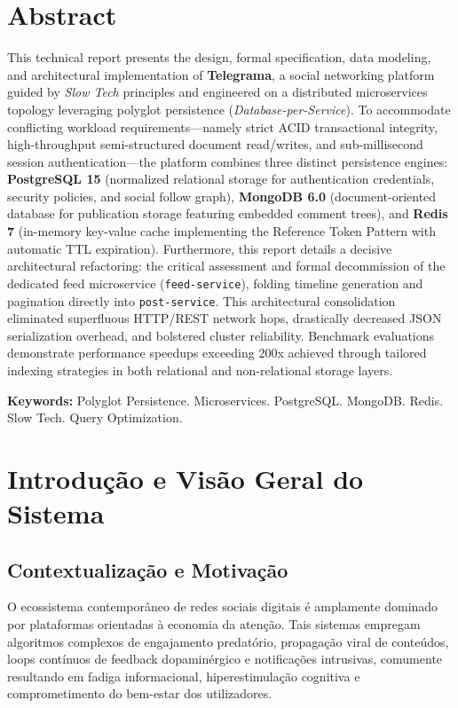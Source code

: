 \documentclass[12pt,a4paper]{report}
\begin{document}
\chapter*{Abstract}
This technical report presents the design, formal specification, data modeling, and architectural implementation of \textbf{Telegrama}, a social networking platform guided by \textit{Slow Tech} principles and engineered on a distributed microservices topology leveraging polyglot persistence (\textit{Database-per-Service}). To accommodate conflicting workload requirements---namely strict ACID transactional integrity, high-throughput semi-structured document read/writes, and sub-millisecond session authentication---the platform combines three distinct persistence engines: \textbf{PostgreSQL 15} (normalized relational storage for authentication credentials, security policies, and social follow graph), \textbf{MongoDB 6.0} (document-oriented database for publication storage featuring embedded comment trees), and \textbf{Redis 7} (in-memory key-value cache implementing the Reference Token Pattern with automatic TTL expiration). Furthermore, this report details a decisive architectural refactoring: the critical assessment and formal decommission of the dedicated feed microservice (\texttt{feed-service}), folding timeline generation and pagination directly into \texttt{post-service}. This architectural consolidation eliminated superfluous HTTP/REST network hops, drastically decreased JSON serialization overhead, and bolstered cluster reliability. Benchmark evaluations demonstrate performance speedups exceeding 200x achieved through tailored indexing strategies in both relational and non-relational storage layers.

\noindent\textbf{Keywords:} Polyglot Persistence. Microservices. PostgreSQL. MongoDB. Redis. Slow Tech. Query Optimization.

\newpage
\tableofcontents
\newpage

\chapter{Introdução e Visão Geral do Sistema}

\section{Contextualização e Motivação}
O ecossistema contemporâneo de redes sociais digitais é amplamente dominado por plataformas orientadas à economia da atenção. Tais sistemas empregam algoritmos complexos de engajamento predatório, propagação viral de conteúdos, loops contínuos de feedback dopaminérgico e notificações intrusivas, comumente resultando em fadiga informacional, hiperestimulação cognitiva e comprometimento do bem-estar dos utilizadores.
\end{document}
